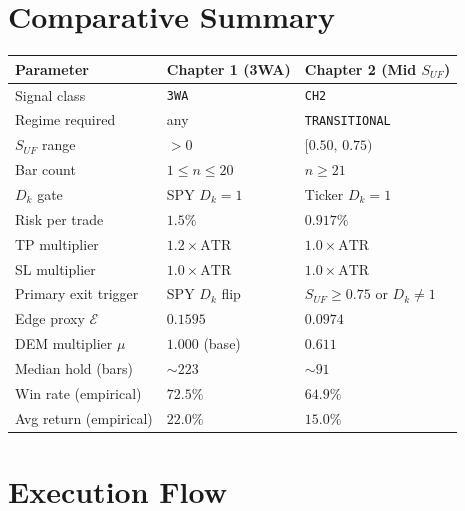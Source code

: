 \documentclass[11pt, a4paper]{article}
\begin{document}
\section{Comparative Summary}

\begin{center}
\begin{tabular}{@{}lll@{}}
\toprule
\textbf{Parameter} & \textbf{Chapter 1 (3WA)} & \textbf{Chapter 2 (Mid $S_{UF}$)} \\
\midrule
Signal class            & \texttt{3WA}               & \texttt{CH2} \\
Regime required         & any                        & \texttt{TRANSITIONAL} \\
$S_{UF}$ range          & $> 0$                      & $[0.50,\, 0.75)$ \\
Bar count               & $1 \leq n \leq 20$         & $n \geq 21$ \\
$D_k$ gate              & SPY $D_k = 1$              & Ticker $D_k = 1$ \\
Risk per trade          & $1.5\%$                    & $0.917\%$ \\
TP multiplier           & $1.2 \times \text{ATR}$    & $1.0 \times \text{ATR}$ \\
SL multiplier           & $1.0 \times \text{ATR}$    & $1.0 \times \text{ATR}$ \\
Primary exit trigger    & SPY $D_k$ flip             & $S_{UF} \geq 0.75$ or $D_k \neq 1$ \\
Edge proxy $\mathcal{E}$ & $0.1595$                  & $0.0974$ \\
DEM multiplier $\mu$    & $1.000$ (base)             & $0.611$ \\
Median hold (bars)      & $\sim 223$                 & $\sim 91$ \\
Win rate (empirical)    & $72.5\%$                   & $64.9\%$ \\
Avg return (empirical)  & $22.0\%$                   & $15.0\%$ \\
\bottomrule
\end{tabular}
\end{center}

\section{Execution Flow}
\end{document}
